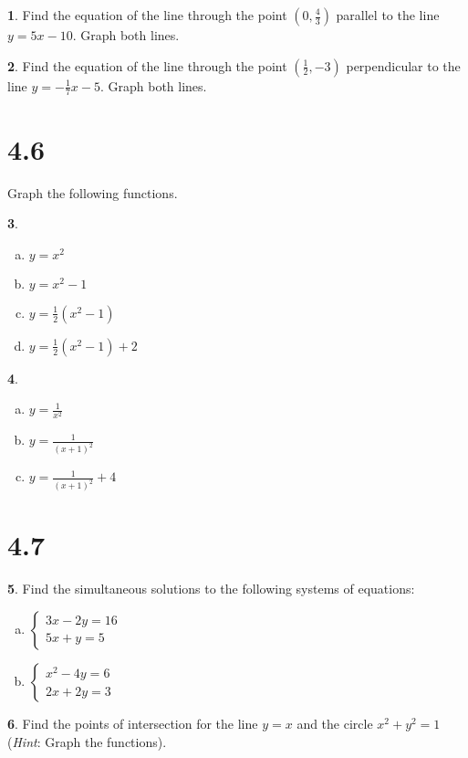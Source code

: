 \documentclass[12pt]{book}
\theoremstyle{definition}
\newtheorem{thm}{}
\begin{document}
\setcounter{thm}{14}
\begin{thm}
  Find the equation of the line through the point $\displaystyle{\left(0, \frac{4}{3}\right)}$ parallel to the line $\displaystyle{y = 5x - 10}$.
  Graph both lines.
\end{thm}

\setcounter{thm}{16}
\begin{thm}
  Find the equation of the line through the point $\displaystyle{\left(\frac{1}{2}, -3\right)}$ perpendicular to the line $\displaystyle{y = -\frac{1}{7}x - 5}$.
  Graph both lines.
\end{thm}

\section*{4.6}

\setcounter{thm}{0}
Graph the following functions.
\begin{thm}
\begin{enumerate}[(a)]
\item
  $\displaystyle{y = x^2}$
\item
  $\displaystyle{y = x^2 - 1}$
\item
  $\displaystyle{y = \frac{1}{2}(x^2 - 1)}$
\item
  $\displaystyle{y = \frac{1}{2}(x^2 - 1) + 2}$
\end{enumerate}
\end{thm}

\setcounter{thm}{3}
\begin{thm}
  \begin{enumerate}[(a)]
  \item
    $\displaystyle{y = \frac{1}{x^2}}$
  \item
    $\displaystyle{y = \frac{1}{(x + 1)^2}}$
  \item
    $\displaystyle{y = \frac{1}{(x + 1)^2} + 4}$
  \end{enumerate}
\end{thm}

\section*{4.7}

\setcounter{thm}{0}
\begin{thm}
  Find the simultaneous solutions to the following systems of equations:
  \begin{enumerate}[(a)]
  \item
    $\displaystyle{\left\{\begin{array}{l}
    3x - 2y = 16\\
    5x + y = 5
    \end{array}
    \right.}$
  \item
    $\displaystyle{\left\{\begin{array}{l}
    x^2 - 4y = 6\\
    2x + 2y = 3
    \end{array}
    \right.}$
  \end{enumerate}
\end{thm}

\setcounter{thm}{2}
\begin{thm}
  Find the points of intersection for the line $y = x$ and the circle $x^2 + y^2 = 1$ ({\it Hint}: Graph the functions).
\end{thm}
\end{document}
